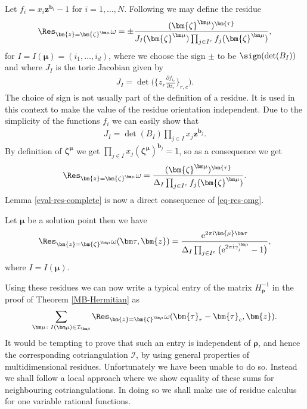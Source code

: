 Let $f_i = x_i\bm{z}^{\bm{b}_i} - 1$ for $i=1,\dots,N$. Following \cite[p.~650]{GH78} we may define the residue
\begin{gather*}
\Res_{\bm{z} = \bm{\zeta}^{\bm\mu}} \omega = \pm \frac{(\bm{\zeta}^{\bm\mu})^{\bm{\tau}}}{J_{I}(\bm{\zeta}^{\bm\mu})\prod_{j \in I^c} f_j(\bm{\zeta}^{\bm\mu}) },
\end{gather*}
for $I = I(\bm{\mu}) = (i_1,\dots,i_d)$, where we choose the sign $\pm$ to be $\sign(\det(B_I))$
and where $J_I$ is the toric Jacobian given by
\begin{gather*}
J_I = \det\bigg(\bigg\{z_r \frac{\partial f_{i_c}}{\partial z_r}\bigg\}_{r,c}\bigg).
\end{gather*}
The choice of sign is not usually part of the definition of a residue. It is used in this context to make the value of the residue orientation independent.
Due to the simplicity of the functions $f_i$ we can easily show that
\begin{gather*}
J_I = \det(B_I) \prod_{j \in I}x_j\bm{z}^{\bm{b}_{j}}.
\end{gather*}
By definition of $\bm{\zeta}^{\bm\mu}$ we get $\prod_{j \in I}x_j(\bm{\zeta}^{\bm\mu})^{\bm{b}_{j}} = 1$, so as a consequence we get
\begin{gather}
\Res_{\bm{z} = \bm{\zeta}^{\bm\mu}} \omega =
\frac{(\bm{\zeta}^{\bm\mu})^{\bm{\tau}}}{\Delta_I
\prod_{j \in I^c} f_j(\bm{\zeta}^{\bm\mu})}.
\label{eq-res-omg}
\end{gather}
\noindent Lemma \ref{eval-res-complete} is now a direct consequence of \eqref{eq-res-omg}.

\begin{Lemma}\label{eval-res-complete}
Let $\bm\mu$ be a solution point then we have
\begin{gather*}
\Res_{\bm{z} = \bm{\zeta}^{\bm\mu}} \omega(\bm\tau,\bm{z}) = \frac{{\rm e}^{2 \pi {\rm i} \bm{\mu} \bm\tau}}{\Delta_I\prod_{j \in I^c}\big({\rm e}^{2 \pi {\rm i} \gamma^{\bm\mu}_j} - 1\big)},
\end{gather*}
where $I = I(\bm\mu)$.
\end{Lemma}


Using these residues we can now write a typical entry of the matrix
$H_{\bm\rho}^{-1}$ in the proof of Theorem \ref{MB-Hermitian} as
\begin{gather*}
\sum_{\bm\mu\colon I(\bm\mu)\in\mathcal{I}_{\bm\rho}}\Res_{\bm{z}=\bm{\zeta}^{\bm\mu}}
\omega(\bm{\tau}_r-\bm{\tau}_c,\bm{z}).
\end{gather*}
It would be tempting to prove that such an entry is independent of $\bm\rho$,
and hence the correspon\-ding cotriangulation $\mathcal{I}$, by
using general properties of multidimensional residues. Unfortunately we have
been unable to do so.
Instead we shall follow a local approach where we show equality of these sums
for neighbouring cotriangulations. In doing so we shall make use of residue
calculus for one variable rational functions.

